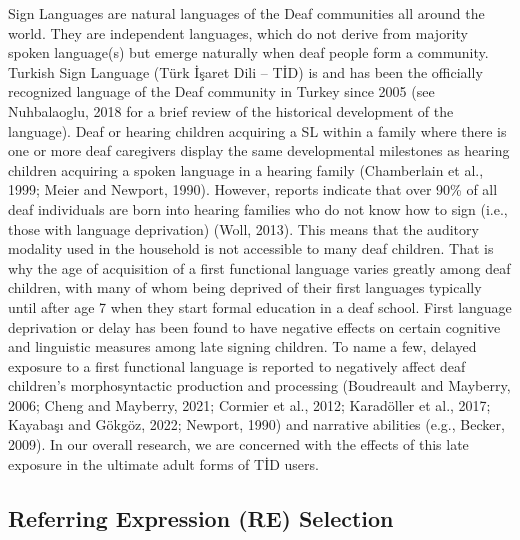 \documentclass[]{elsarticle} %
\begin{document}
Sign Languages are natural languages of the Deaf communities all around
the world. They are independent languages, which do not derive from
majority spoken language(s) but emerge naturally when deaf people form a
community. Turkish Sign Language (Türk İşaret Dili -- TİD) is and has
been the officially recognized language of the Deaf community in Turkey
since 2005 (see Nuhbalaoglu, 2018 for a brief review of the historical
development of the language). Deaf or hearing children acquiring a SL
within a family where there is one or more deaf caregivers display the
same developmental milestones as hearing children acquiring a spoken
language in a hearing family (Chamberlain et al., 1999; Meier and
Newport, 1990). However, reports indicate that over 90\% of all deaf
individuals are born into hearing families who do not know how to sign
(i.e., those with language deprivation) (Woll, 2013). This means that
the auditory modality used in the household is not accessible to many
deaf children. That is why the age of acquisition of a first functional
language varies greatly among deaf children, with many of whom being
deprived of their first languages typically until after age 7 when they
start formal education in a deaf school. First language deprivation or
delay has been found to have negative effects on certain cognitive and
linguistic measures among late signing children. To name a few, delayed
exposure to a first functional language is reported to negatively affect
deaf children's morphosyntactic production and processing (Boudreault
and Mayberry, 2006; Cheng and Mayberry, 2021; Cormier et al., 2012;
Karadöller et al., 2017; Kayabaşı and Gökgöz, 2022; Newport, 1990) and
narrative abilities (e.g., Becker, 2009). In our overall research, we
are concerned with the effects of this late exposure in the ultimate
adult forms of TİD users.

\hypertarget{referring-expression-re-selection}{%
\subsection{Referring Expression (RE)
Selection}\label{referring-expression-re-selection}}
\end{document}
